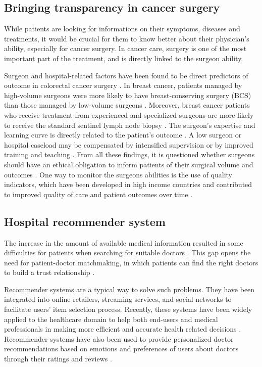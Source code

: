 \subsection{Bringing transparency in cancer surgery}

While patients are looking for informations on their symptoms, diseases and treatments, it would be crucial for them to know better about their physician's ability, especially for cancer surgery. In cancer care, surgery is one of the most important part of the treatment, and is directly linked to the surgeon ability.

Surgeon and hospital-related factors have been found to be direct predictors of outcome in colorectal cancer surgery \cite{renzulli_influence_2006, bonati_surgeon_2021}. In breast cancer, patients managed by high-volume surgeons were more likely to have breast-conserving surgery (BCS) than those managed by low-volume surgeons \cite{mcdermott_surgeon_2013}. Moreover, breast cancer patients who receive treatment from experienced and specialized surgeons are more likely to receive the standard sentinel lymph node biopsy \cite{yen_surgeon_2014}. The surgeon's expertise and learning curve is directly related to the patient's outcome \cite{renzulli_learning_2005}. A low surgeon or hospital caseload may be compensated by intensified supervision or by improved training and teaching \cite{bonati_surgeon_2021}. From all these findings, it is questioned whether surgeons should have an ethical obligation to inform patients of their surgical volume and outcomes \cite{glaser_surgeon_2019}. One way to monitor the surgeons abilities is the use of quality indicators, which have been developed in high income countries and contributed to improved quality of care and patient outcomes over time \cite{nietz_quality_2020}.

\subsection{Hospital recommender system}

The increase in the amount of available medical information resulted in some difficulties for patients when searching for suitable doctors \cite{narducci_recommender_2015, hoens_reliable_2010}. This gap opens the need for patient-doctor matchmaking, in which patients can find the right doctors to build a trust relationship \cite{han_hybrid_2018}.

Recommender systems are a typical way to solve such problems. They have been integrated into online retailers, streaming services, and social networks to facilitate users' item selection process. Recently, these systems have been widely applied to the healthcare domain to help both end-users and medical professionals in making more efficient and accurate health related decisions \cite{tran_recommender_2021}. Recommender systems have also been used to provide personalized doctor recommendations based on emotions and preferences of users about doctors through their ratings and reviews \cite{zhang_idoctor_2017}.

